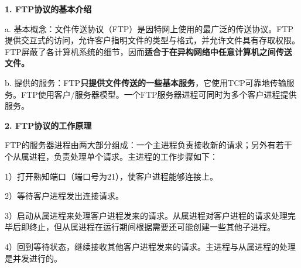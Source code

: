\textbf{{1. FTP协议的基本介绍}}

{{a.
基本概念：}文件传送协议（FTP）是因特网上使用的最广泛的传送协议。}FTP提供交互式的访问，允许客户指明文件的类型与格式，并允许文件具有存取权限。FTP屏蔽了各计算机系统的细节，因而\textbf{适合于在异构网络中任意计算机之间传送文件。}

b.
提供的服务：FTP\textbf{只提供文件传送的一些基本服务}，它使用TCP可靠地传输服务。FTP使用客户/服务器模型。一个FTP服务器进程可同时为多个客户进程提供服务。

\textbf{{2. FTP协议的工作原理}}

FTP的服务器进程由两大部分组成：一个主进程负责接收新的请求；另外有若干个从属进程，负责处理单个请求。主进程的工作步骤如下：

1）打开熟知端口（端口号为21），使客户进程能够连接上。

2）等待客户进程发出连接请求。

3）启动从属进程来处理客户进程发来的请求。从属进程对客户进程的请求处理完毕后即终止，但从属进程在运行期间根据需要还可能创建一些其他子进程。

4）回到等待状态，继续接收其他客户进程发来的请求。主进程与从属进程的处理是并发进行的。
